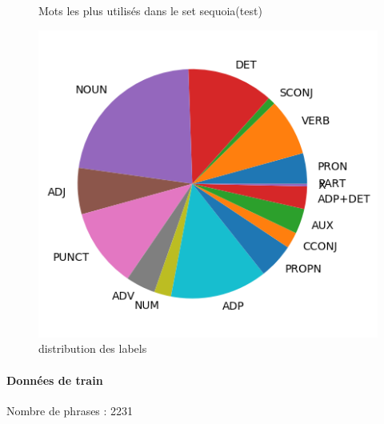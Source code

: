 \begin{figure}[H]
\begin{minipage}{0.48\textwidth}
\begin{tabular}{|l || *{11 }{|c} |}
\end{tabular}
\caption{ Mots les plus utilisés dans le set sequoia(test) } \label{Fig:muw}\end{minipage} 
\begin{minipage}{0.48\textwidth} \centering
\includegraphics[width=.7\linewidth]{sequoiatest_img.png}
\caption{distribution des labels}
\end{minipage}
\end{figure} \paragraph{Données de train \\ }  
 Nombre de phrases : 2231\\ 
